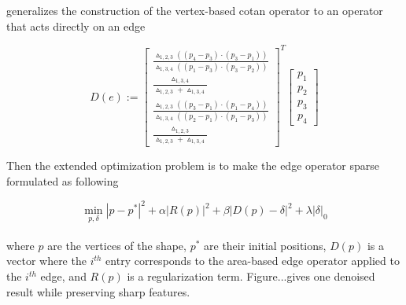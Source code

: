 \cite{he2013mesh} generalizes the construction of the vertex-based cotan operator to an operator that acts directly on an edge

\small{
\begin{equation}
 \label{eq:edgecotanoperator}
 D(e) := {\left[ \begin{array}{c}
 \frac{\vartriangle_{1,2,3}((p_4-p_3)\cdot(p_3-p_1))}{\vartriangle_{1,3,4}((p_1-p_3)\cdot(p_3-p_2))} \\
 \frac{\vartriangle_{1,3,4}}{\vartriangle_{1,2,3}+\vartriangle_{1,3,4}} \\
 \frac{\vartriangle_{1,2,3}((p_3-p_1)\cdot(p_1-p_4))}{\vartriangle_{1,3,4}((p_2-p_1)\cdot(p_1-p_3))} \\
 \frac{\vartriangle_{1,2,3}}{\vartriangle_{1,2,3}+\vartriangle_{1,3,4}}
 \end{array}
 \right]}^{T}
 \left[ \begin{array}{c}
 p_1 \\ p_2 \\ p_3 \\ p_4
 \end{array}
 \right]
\end{equation}
}

Then the extended optimization problem is to make the edge operator sparse formulated as following

\small{
\begin{equation}
 \label{eq:edgecotanoperator}
 \min_{p,\delta}|p-p^{*}|^2+\alpha|R(p)|^2+\beta|D(p)-\delta|^2+\lambda|\delta|_0
\end{equation}
}
\\
where $p$ are the vertices of the shape, $p^{*}$ are their initial positions, $D(p)$ is a vector where the $i^{th}$ entry corresponds to the area-based edge operator applied to the $i^{th}$ edge, and $R(p)$ is a regularization term. Figure...gives one denoised result while preserving sharp features.

